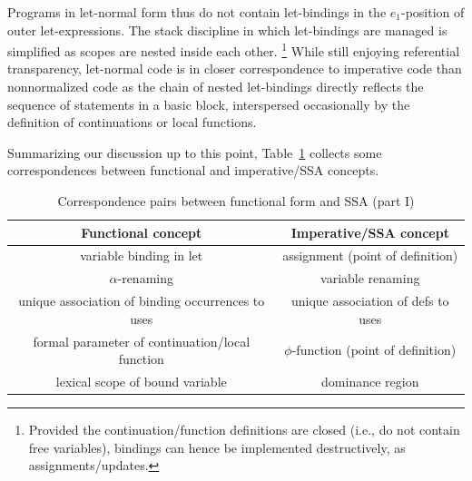 Programs in let-normal form thus do not contain let-bindings in the
$e_1$-position of outer let-expressions. The stack discipline in which
let-bindings are managed is simplified as scopes are nested inside
each other. \footnote{Provided the continuation/function definitions
are closed (i.e., do not contain free variables), bindings can hence
be implemented destructively, as assignments/updates.} While still
enjoying referential transparency, let-normal code is in closer
correspondence to imperative code than nonnormalized code as the chain
of nested let-bindings directly reflects the sequence of statements in
a basic block, interspersed occasionally by the definition of
continuations or local functions.




Summarizing our discussion up to this point,
Table~\ref{tableFunctionalCorrespondencesZero} collects some
correspondences between functional and imperative/SSA concepts.
\begin{table}
\begin{center}
\begin{tabular}{|c|c|}
  \hline Functional concept & Imperative/SSA concept\\ 
  \hline \hline
  variable binding in let & assignment (point of definition)\\
  $\alpha$-renaming & variable renaming\\
  unique association of binding occurrences to uses & unique
  association of defs to uses\\ 
  formal parameter of continuation/local function & 
    $\phi$-function (point of definition)\\ 
  lexical scope of bound variable & dominance region\\ 
  \hline
\end{tabular}
\end{center}
\caption{\label{tableFunctionalCorrespondencesZero}
  Correspondence pairs between functional form and SSA (part I)}
\end{table}

